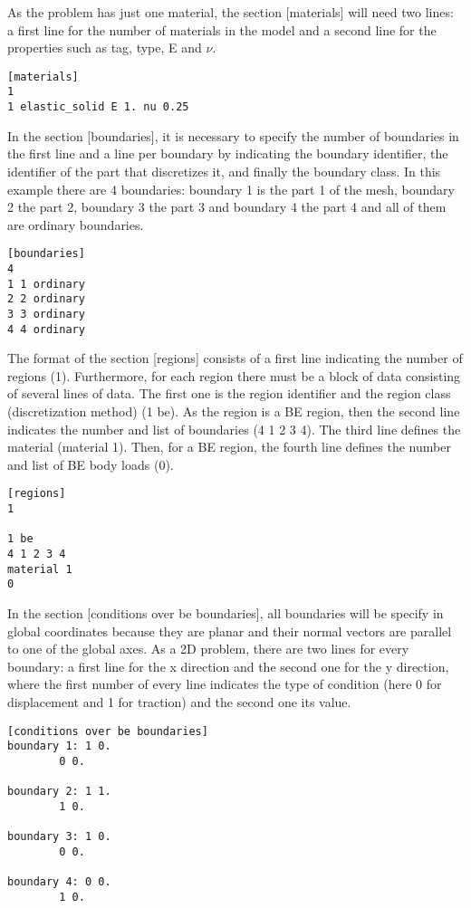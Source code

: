 \documentclass[A4]{article}
\begin{document}
As the problem has just one material, the section [materials] will need two lines: a first line for the number of materials in the model and a second line for the properties such as tag, type, E and $\nu$.

\begin{Verbatim}	
[materials]
1
1 elastic_solid E 1. nu 0.25
\end{Verbatim}

In the section [boundaries], it is necessary to specify the number of boundaries in the first line and a line per boundary by indicating the boundary identifier, the identifier of the part that discretizes it, and finally the boundary class. In this example there are 4 boundaries: boundary 1 is the part 1 of the mesh, boundary 2 the part 2, boundary 3 the part 3 and boundary 4 the part 4 and all of them are ordinary boundaries.

\begin{Verbatim}	
[boundaries]
4
1 1 ordinary
2 2 ordinary
3 3 ordinary
4 4 ordinary
\end{Verbatim}

The format of the section [regions] consists of a first line indicating the number of regions (1). Furthermore, for each region there must be a block of data consisting of several lines of data. The first one is the region identifier and the region class (discretization method) (1 be). As the region is a BE region, then the second line indicates the number  and list of boundaries (4 1 2 3 4). The third line defines the material (material 1). Then, for a BE region, the fourth line defines the number and list of BE body loads (0).

\begin{Verbatim}	
[regions]
1

1 be
4 1 2 3 4
material 1
0
\end{Verbatim}

In the section [conditions over be boundaries], all boundaries will be specify in global coordinates because they are planar and their normal vectors are parallel to one of the global axes. As a 2D problem, there are two lines for every boundary: a first line for the x direction and the second one for the y direction, where the first number of every line indicates the type of condition (here 0 for displacement and 1 for traction) and the second one its value.

\begin{Verbatim}	
[conditions over be boundaries]
boundary 1: 1 0.
    	0 0.

boundary 2: 1 1.
	    1 0.

boundary 3: 1 0.
	    0 0.

boundary 4: 0 0.
	    1 0.
\end{Verbatim}
\end{document}
